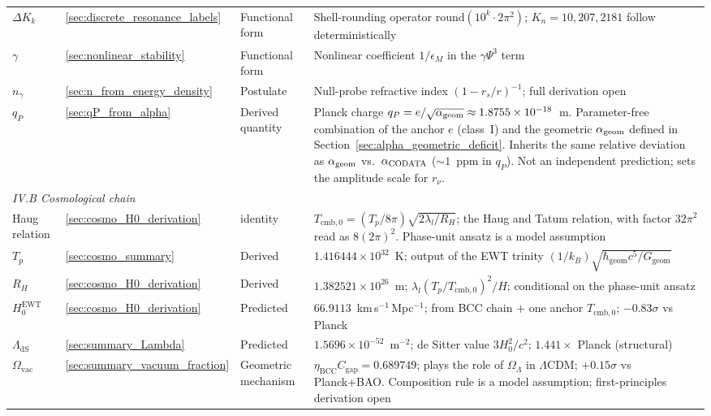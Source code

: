\documentclass[10pt,a4paper]{article}
\begin{document}
{\begin{longtable}{@{}p{3.2cm}p{1.8cm}p{2.6cm}p{6.0cm}@{}}
		$\Delta K_k$ & \ref{sec:discrete_resonance_labels} & Functional form & Shell-rounding operator $\mathrm{round}(10^k \cdot 2\pi^2)$; $K_n = 10, 207, 2181$ follow deterministically \\
		$\gamma$ & \ref{sec:nonlinear_stability} & Functional form & Nonlinear coefficient $1/\epsilon_M$ in the $\gamma \Psi^3$ term \\
		$n_\gamma$ & \ref{sec:n_from_energy_density} & Postulate & Null-probe refractive index $(1 - r_s/r)^{-1}$; full derivation open \\
		$q_P$ & \ref{sec:qP_from_alpha} & Derived quantity & Planck charge $q_P = e/\sqrt{\alpha_{\rm geom}} \approx 1.8755 \times 10^{-18}$~m. Parameter-free combination of the anchor $e$ (class~I) and the geometric $\alpha_{\rm geom}$ defined in Section~\ref{sec:alpha_geometric_deficit}. Inherits the same relative deviation as $\alpha_{\rm geom}$ vs.\ $\alpha_{\rm CODATA}$ ($\sim 1$~ppm in $q_P$). Not an independent prediction; sets the amplitude scale for $r_\nu$. \\
		\midrule
		\multicolumn{4}{l}{\textit{IV.B Cosmological chain}} \\
		\midrule
		Haug relation & \ref{sec:cosmo_H0_derivation} & identity & $T_{\text{cmb},0} = (T_p/8\pi)\sqrt{2\lambda_l/R_H}$; the Haug and Tatum relation, with factor $32\pi^2$ read as $8(2\pi)^2$. Phase-unit ansatz is a model assumption \\
		$T_p$ & \ref{sec:cosmo_summary} & Derived & $1.416444 \times 10^{32}$~K; output of the EWT trinity $(1/k_B)\sqrt{\hbar_{\text{geom}} c^5/G_{\text{geom}}}$ \\
		$R_H$ & \ref{sec:cosmo_H0_derivation} & Derived & $1.382521 \times 10^{26}$~m; $\lambda_l (T_p/T_{\text{cmb},0})^2/H$; conditional on the phase-unit ansatz \\
		$H_0^{\text{EWT}}$ & \ref{sec:cosmo_H0_derivation} & Predicted & $66.9113$~km\,s$^{-1}$\,Mpc$^{-1}$; from BCC chain $+$ one anchor $T_{\text{cmb},0}$; $-0.83\sigma$ vs Planck \\
		$\Lambda_{\text{dS}}$ & \ref{sec:summary_Lambda} & Predicted & $1.5696 \times 10^{-52}$~m$^{-2}$; de Sitter value $3H_0^2/c^2$; $1.441\times$ Planck (structural) \\
		$\Omega_{\text{vac}}$ & \ref{sec:summary_vacuum_fraction} & Geometric mechanism & $\eta_{\text{BCC}} C_{\text{gap}} = 0.689749$; plays the role of $\Omega_\Lambda$ in $\Lambda$CDM; $+0.15\sigma$ vs Planck+BAO. Composition rule is a model assumption; first-principles derivation open \\

\end{longtable}}
\end{document}
